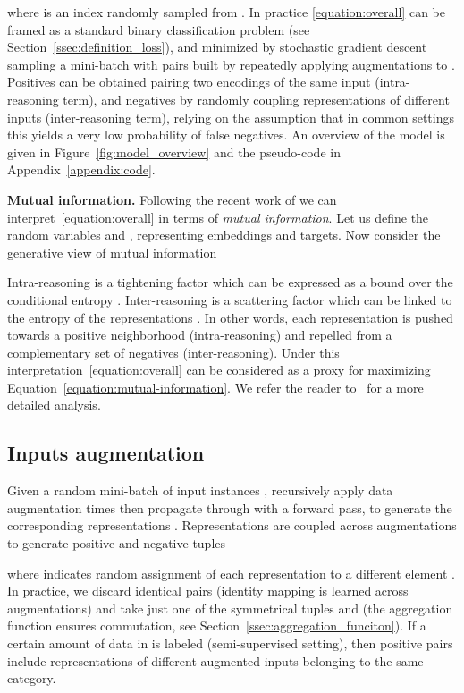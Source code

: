 \documentclass{article}
\begin{document}
where  is an index randomly sampled from . 
In practice \eqref{equation:overall} can be framed as a standard binary classification problem (see Section~\ref{ssec:definition_loss}), and minimized by stochastic gradient descent sampling a mini-batch  with pairs built by repeatedly applying  augmentations to . Positives can be obtained pairing two encodings of the same input (intra-reasoning term), and negatives by randomly coupling representations of different inputs (inter-reasoning term), relying on the assumption that in common settings this yields a very low probability of false negatives.
An overview of the model is given in Figure~\ref{fig:model_overview} and the pseudo-code in Appendix~\ref{appendix:code}.

\textbf{Mutual information.} Following the recent work of \cite{boudiaf2020metric} we can interpret~\eqref{equation:overall} in terms of \emph{mutual information}. Let us define the random variables  and , representing embeddings and targets. Now consider the generative view of mutual information 

Intra-reasoning is a tightening factor which can be expressed as a bound over the conditional entropy . Inter-reasoning is a scattering factor which can be linked to the entropy of the representations . In other words, each representation is pushed towards a positive neighborhood (intra-reasoning) and repelled from a complementary set of negatives (inter-reasoning).
Under this interpretation~\eqref{equation:overall} can be considered as a proxy for maximizing Equation~\eqref{equation:mutual-information}. We refer the reader to~\cite{boudiaf2020metric} for a more detailed analysis.


\subsection{Inputs augmentation}\label{ssec:inputs_augmentation}

Given a random mini-batch of  input instances , recursively apply data augmentation  times  then propagate through  with a forward pass, to generate the corresponding representations .
Representations are coupled across augmentations to generate positive and negative tuples

where  indicates random assignment of each representation  to a different element . In practice, we discard identical pairs (identity mapping is learned across augmentations) and take just one of the symmetrical tuples  and  (the aggregation function ensures commutation, see Section~\ref{ssec:aggregation_funciton}).
If a certain amount of data in  is labeled (semi-supervised setting), then positive pairs include representations of different augmented inputs belonging to the same category.
\end{document}
